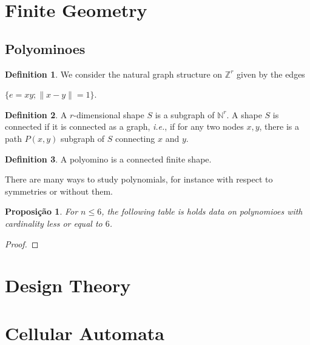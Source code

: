 \documentclass[]{article}
\newtheorem{proposition}{Proposição}[section]
\theoremstyle{definition}
\newtheorem{definition}{Definition}[section]
\theoremstyle{definition}
\newcommand{\ie}{\textit{i.e.}}
\newcommand{\bb}{\mathbb}
\begin{document}
	
	
	\section{Finite Geometry}
	
	\subsection{Polyominoes}
	
	\begin{definition}
		We consider the natural graph structure on $\bb{Z}^r$ given by the edges 
		
		\begin{center}
			$\{e=xy; \|x-y\|=1 \}$.
		\end{center}
	\end{definition}
	
	\begin{definition}
		A $r$-dimensional shape $S$ is a subgraph of $\bb{N}^r$. A shape $S$ is connected if it is connected as a graph, \ie, if for any two nodes $x, y$, there is a path $P(x, y)$ subgraph of $S$ connecting $x$ and $y$. 
	\end{definition}
	
	\begin{definition}
		A polyomino is a connected finite shape.
	\end{definition}
	
	There are many ways to study polynomials, for instance with respect to symmetries or without them.
	
	\begin{proposition}
		For $n \leq 6$, the following table is holds data on polynomioes with cardinality less or equal to $6$. 
		
		
		
	\end{proposition}
	
	\begin{proof}
		
	\end{proof}
	
	
	
	
	\section{Design Theory}
	\section{Cellular Automata}
	
\end{document}
